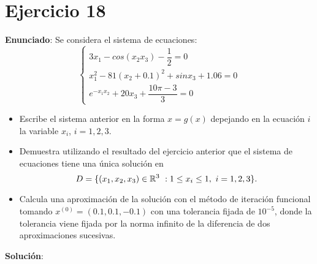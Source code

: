 \documentclass[11pt]{article}
\begin{document}
\section{Ejercicio 18}
\textbf{Enunciado}:
Se considera el sistema de ecuaciones:
\[
\begin{cases}
	3x_1 - cos(x_2x_3) - \dfrac{1}{2} = 0\\
	 x_1^2 -81(x_2+0.1)^2 + sinx_3 +1.06 = 0\\
	 e^{-x_1x_2}+20x_3+\dfrac{10\pi-3}{3} = 0
\end{cases}
\] 
\begin{itemize}
	\item Escribe el sistema anterior en la forma $x=g(x)$ depejando en la ecuación $i$ la variable $x_i$, $i=1,2,3$.
	\item Demuestra utilizando el resultado del ejercicio anterior que el sistema de ecuaciones tiene una única solución en 
	\[
	D = \{(x_1,x_2,x_3) \in \mathbb R^3 \ : \- 1 \leq x_i \leq 1, \ i = 1,2,3\}.
	\]
	
	\item Calcula una aproximación de la solución con el método de iteración funcional tomando $x^{(0)} = (0.1,0.1,-0.1)$ con una tolerancia fijada de $10^{-5}$, donde la tolerancia viene fijada por la norma infinito de la diferencia de dos aproximaciones sucesivas.

\end{itemize}

\textbf{Solución}:
\end{document}
